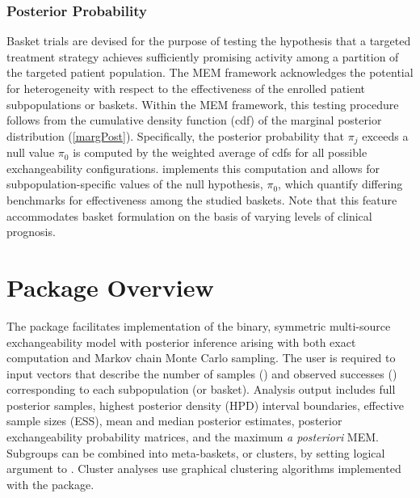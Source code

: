 \subsubsection{Posterior Probability}

Basket trials are devised for the purpose of testing the hypothesis that a targeted treatment strategy achieves sufficiently promising activity among a partition of the targeted patient population. The MEM framework acknowledges the potential for heterogeneity with respect to the effectiveness of the enrolled patient subpopulations or baskets. Within the MEM framework, this testing procedure follows from the cumulative density function (cdf) of the marginal posterior distribution (\ref{margPost}). Specifically, the posterior probability that $\pi_j$ exceeds a null value $\pi_0$ is computed by the weighted average of cdfs for all possible exchangeability configurations.  implements this computation and allows for subpopulation-specific values of the null hypothesis, $\pi_0$, which quantify differing benchmarks for effectiveness among the studied baskets. Note that this feature accommodates basket formulation on the basis of varying levels of clinical prognosis.

\section{Package Overview}

The  package facilitates implementation of the binary, symmetric multi-source exchangeability model with posterior inference arising with both exact computation and Markov chain Monte Carlo sampling. The user is required to input vectors that describe the number of samples () and observed successes () corresponding to each subpopulation (or basket). Analysis output includes full posterior samples, highest posterior density (HPD) interval boundaries, effective sample sizes (ESS), mean and median posterior estimates, posterior exchangeability probability matrices, and the maximum \emph{a posteriori} MEM. Subgroups can be combined into meta-baskets, or clusters, by setting logical argument  to . Cluster analyses use graphical clustering algorithms implemented with the  package. 

